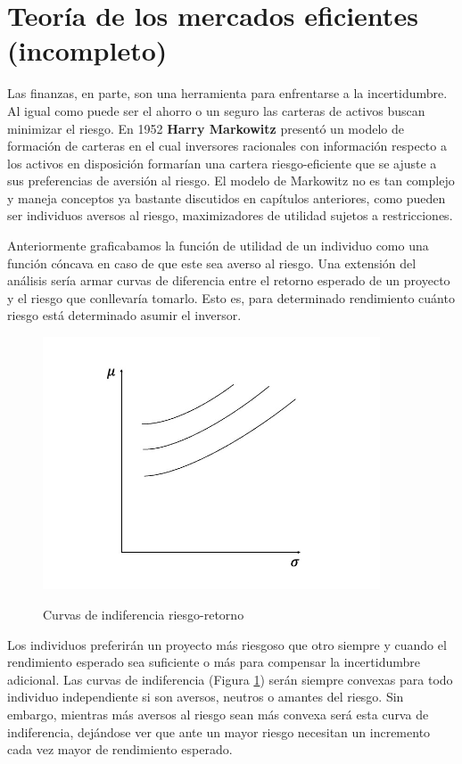 \section{Teoría de los mercados eficientes (incompleto)}
Las finanzas, en parte, son una herramienta para enfrentarse a la incertidumbre. Al igual como puede ser el ahorro o un seguro las carteras de activos buscan minimizar el riesgo. En 1952 \textbf{Harry Markowitz} presentó un modelo de formación de carteras en el cual inversores racionales con información respecto a los activos en disposición formarían una cartera riesgo-eficiente que se ajuste a sus preferencias de aversión al riesgo. El modelo de Markowitz no es tan complejo y maneja conceptos ya bastante discutidos en capítulos anteriores, como pueden ser individuos aversos al riesgo, maximizadores de utilidad sujetos a restricciones.

Anteriormente graficabamos la función de utilidad de un individuo como una función cóncava en caso de que este sea averso al riesgo. Una extensión del análisis sería armar curvas de diferencia entre el retorno esperado de un proyecto y el riesgo que conllevaría tomarlo. Esto es, para determinado rendimiento cuánto riesgo está determinado asumir el inversor. 
\begin{figure}[ht]
    \centering
    \caption{Curvas de indiferencia riesgo-retorno}
    \includegraphics[width=10cm]{Figuras/Curvas de indiferencia riesgo-retorno.jpeg}
    \label{fig: Curvas de indiferencia riesgo-retorno}
\end{figure}
Los individuos preferirán un proyecto más riesgoso que otro siempre y cuando el rendimiento esperado sea suficiente o más para compensar la incertidumbre adicional. Las curvas de indiferencia (Figura \ref{fig: Curvas de indiferencia riesgo-retorno}) serán siempre convexas para todo individuo independiente si son aversos, neutros o amantes del riesgo. Sin embargo, mientras más aversos al riesgo sean más convexa será esta curva de indiferencia, dejándose ver que ante un mayor riesgo necesitan un incremento cada vez mayor de rendimiento esperado.

